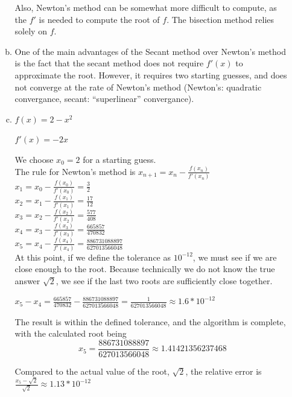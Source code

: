 \documentclass[11pt]{article}
\begin{document}
\begin{enumerate}
\begin{enumerate}[(a)]
		Also, Newton's method can be somewhat more difficult to compute, as the $f'$ is needed to compute the root of $f$. The
		bisection method relies solely on $f$. \\

		\item One of the main advantages of the Secant method over Newton's method is the fact that the secant method does not require
		$f'(x)$ to approximate the root. However, it requires two starting guesses, and does not converge at the rate of
		Newton's method (Newton's: quadratic convergance, secant: ``superlinear'' convergance).


		\item $f(x) = 2-x^2$

		$f'(x) = -2x$

		We choose $x_0=2$ for a starting guess. \\

		The rule for Newton's method is $x_{n+1} = x_n-\frac{f(x_n)}{f'(x_n)}$ \\

		$x_1 = x_0 - \frac{f(x_0)}{f'(x_0)} = \frac{3}{2}$ \\

		$x_2 = x_1 - \frac{f(x_1)}{f'(x_1)} = \frac{17}{12}$ \\

		$x_3 = x_2 - \frac{f(x_2)}{f'(x_2)} = \frac{577}{408}$ \\

		$x_4 = x_3 - \frac{f(x_3)}{f'(x_3)} = \frac{665857}{470832}$ \\

		$x_5 = x_4 - \frac{f(x_4)}{f'(x_4)} = \frac{886731088897}{627013566048}$ \\

		At this point, if we define the tolerance as $10^{-12}$, we must see if we are close enough to the root. Because technically
		we do not know the true answer $\sqrt{2}$, we see if the last two roots are sufficiently close together.

		$x_5 - x_4 = \frac{665857}{470832} - \frac{886731088897}{627013566048} = \frac{1}{627013566048} \approx 1.6*10^{-12}$

		The result is within the defined tolerance, and the algorithm is complete, with the calculated root being
		$$x_5 = \frac{886731088897}{627013566048} \approx 1.41421356237468$$

		Compared to the actual value of the root, $\sqrt{2}$, the relative error is
		$\frac{x_5 - \sqrt{2}}{\sqrt{2}} \approx 1.13*10^{-12}$ \\


\end{enumerate}
\end{enumerate}
\end{document}
